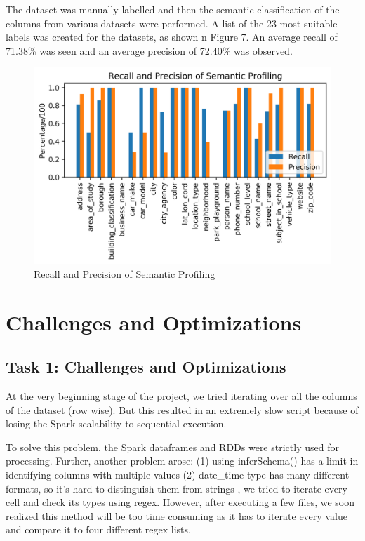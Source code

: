\documentclass[sigconf,authordraft]{acmart}
\begin{document}
The dataset was manually labelled and then the semantic classification of the columns from various datasets were performed. A list of the 23 most suitable labels was created for the datasets, as shown n Figure 7. An average recall of 71.38\% was seen and an average precision of 72.40\% was observed.
\begin{figure}[H]
  \centering
  \includegraphics[width=\linewidth]{precision_recall.png}
  \caption{Recall and Precision of Semantic Profiling}
\end{figure}

\section{Challenges and Optimizations}
\subsection{Task 1: Challenges and Optimizations}
At the very beginning stage of the project, we tried iterating over all the columns of the dataset (row wise). But this resulted in an extremely slow script because of losing the Spark scalability to sequential execution. 
 
To solve this problem, the Spark dataframes and RDDs were strictly used for processing. Further, another problem arose: (1) using inferSchema() has a limit in identifying columns with multiple values (2) date\_time type has many different formats, so it’s hard to distinguish them from strings , we tried to iterate every cell and check its types using regex. However, after executing a few files, we soon realized this method will be too time consuming as it has to iterate every value and compare it to four different regex lists. 
\end{document}
